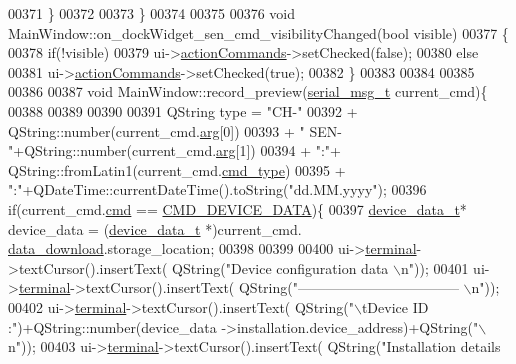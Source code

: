 \begin{DoxyCode}
00371     \}
00372 
00373 \}
00374 
00375 
00376 \textcolor{keywordtype}{void} MainWindow::on\_dockWidget\_sen\_cmd\_visibilityChanged(\textcolor{keywordtype}{bool} visible)
00377 \{
00378     \textcolor{keywordflow}{if}(!visible)
00379         ui->\hyperlink{a00027_a3dccdc21d3df68b86550093b5e3c0356}{actionCommands}->setChecked(\textcolor{keyword}{false});
00380     \textcolor{keywordflow}{else}
00381        ui->\hyperlink{a00027_a3dccdc21d3df68b86550093b5e3c0356}{actionCommands}->setChecked(\textcolor{keyword}{true});
00382 \}
00383 
00384 
00385 
00386 
00387 \textcolor{keywordtype}{void} MainWindow::record\_preview(\hyperlink{a00001_df/dc8/a00122}{serial\_msg\_t} current\_cmd)\{
00388     
00389     
00390 
00391     QString type = \textcolor{stringliteral}{"CH-"}
00392                    + QString::number(current\_cmd.\hyperlink{a00001_a56e6c2d7315d0ae60a51e8b140c9cfe4}{arg}[0])
00393                    + \textcolor{stringliteral}{" SEN-"}+QString::number(current\_cmd.\hyperlink{a00001_a56e6c2d7315d0ae60a51e8b140c9cfe4}{arg}[1])
00394                    + \textcolor{stringliteral}{":"}+ QString::fromLatin1(current\_cmd.\hyperlink{a00001_a217dc0db956d3bb46d8573960cb7359a}{cmd\_type})
00395                    + \textcolor{stringliteral}{":"}+QDateTime::currentDateTime().toString(\textcolor{stringliteral}{"dd.MM.yyyy"});
00396     \textcolor{keywordflow}{if}(current\_cmd.\hyperlink{a00001_af20664dc9ca2b752c73d524edee0e07a}{cmd} == \hyperlink{a00031_a4412fcb90fb9171d432a624428881e70}{CMD\_DEVICE\_DATA})\{
00397        \hyperlink{a00003_a95029dff9c90f6a6907353ba86eb3f33}{device\_data\_t}* device\_data = (\hyperlink{a00003_a95029dff9c90f6a6907353ba86eb3f33}{device\_data\_t} *)current\_cmd.
      \hyperlink{a00001_a5cfeaed4d4f8e51070a324c0ba893ebe}{data\_download}.storage\_location;
00398 
00399 
00400        ui->\hyperlink{a00027_aae71c46ea4546df5994735dee573b2dd}{terminal}->textCursor().insertText( QString(\textcolor{stringliteral}{"Device configuration data \(\backslash\)n"}));
00401        ui->\hyperlink{a00027_aae71c46ea4546df5994735dee573b2dd}{terminal}->textCursor().insertText( QString(\textcolor{stringliteral}{"----------------------------------- \(\backslash\)n"}));
00402        ui->\hyperlink{a00027_aae71c46ea4546df5994735dee573b2dd}{terminal}->textCursor().insertText( QString(\textcolor{stringliteral}{"\(\backslash\)tDevice ID :"})+QString::number(device\_data
      ->installation.device\_address)+QString(\textcolor{stringliteral}{"\(\backslash\)n"}));
00403        ui->\hyperlink{a00027_aae71c46ea4546df5994735dee573b2dd}{terminal}->textCursor().insertText( QString(\textcolor{stringliteral}{"Installation details
}
\end{DoxyCode}
